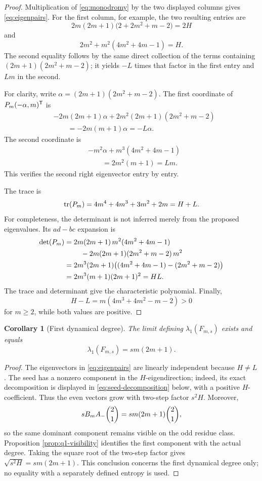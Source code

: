 \documentclass[11pt]{article}
\newtheorem{corollary}[theorem]{Corollary}
\theoremstyle{definition}
\theoremstyle{remark}
\begin{document}
\begin{proof}
Multiplication of \eqref{eq:monodromy} by the two displayed columns gives
\eqref{eq:eigenpairs}.  For the first column, for example, the two resulting
entries are
\[
2m(2m+1)\bigl(2+2m^2+m-2\bigr)=2H
\]
and
\[
2m^2+m^2(4m^2+4m-1)=H.
\]
The second equality follows by the same direct collection of the terms
containing \((2m+1)(2m^2+m-2)\); it yields \(-L\) times that factor in the
first entry and \(Lm\) in the second.

For clarity, write
\(\alpha=(2m+1)(2m^2+m-2)\).  The first coordinate of
\(P_m(-\alpha,m)^{\mathsf{T}}\) is
\begin{align*}
&-2m(2m+1)\alpha
+2m^2(2m+1)(2m^2+m-2)\\
&\qquad=-2m(m+1)\alpha=-L\alpha.
\end{align*}
The second coordinate is
\begin{align*}
&-m^2\alpha+m^3(4m^2+4m-1)\\
&\qquad=2m^2(m+1)=Lm.
\end{align*}
This verifies the second right eigenvector entry by entry.

The trace is
\begin{equation}
\operatorname{tr}(P_m)=4m^4+4m^3+3m^2+2m=H+L.
\label{eq:trace}
\end{equation}
For completeness, the determinant is not inferred merely from the proposed
eigenvalues.  Its \(ad-bc\) expansion is
\begin{align}
\det(P_m)
={}&2m(2m+1)\,m^2(4m^2+4m-1)\notag\\
&\quad-2m(2m+1)(2m^2+m-2)\,m^2\notag\\
={}&2m^3(2m+1)\bigl((4m^2+4m-1)-(2m^2+m-2)\bigr)\notag\\
={}&2m^3(m+1)(2m+1)^2=HL.
\label{eq:determinant-expansion}
\end{align}
The trace and determinant give the characteristic polynomial.  Finally,
\[
H-L=m(4m^3+4m^2-m-2)>0
\]
for \(m\geq2\), while both values are positive.
\end{proof}

\begin{corollary}[First dynamical degree]
\label{cor:dynamical-degree}
The limit defining \(\lambda_1(F_{m,s})\) exists and equals
\[
\lambda_1(F_{m,s})=sm(2m+1).
\]
\end{corollary}

\begin{proof}
The eigenvectors in \eqref{eq:eigenpairs} are linearly independent because
\(H\neq L\).  The seed has a nonzero component in the \(H\)-eigendirection;
indeed, its exact decomposition is displayed in
\eqref{eq:seed-decomposition} below, with a positive \(H\)-coefficient.
Thus the even vectors grow with two-step factor \(s^2H\).  Moreover,
\[
sB_mA_{-}\binom{2}{1}=sm(2m+1)\binom{2}{1},
\]
so the same dominant component remains visible on the odd residue class.
Proposition \ref{prop:q1-visibility} identifies the first component with the
actual degree.  Taking the square root of the two-step factor gives
\(\sqrt{s^2H}=sm(2m+1)\).  This conclusion concerns the first dynamical
degree only; no equality with a separately defined entropy is used.
\end{proof}
\end{document}
